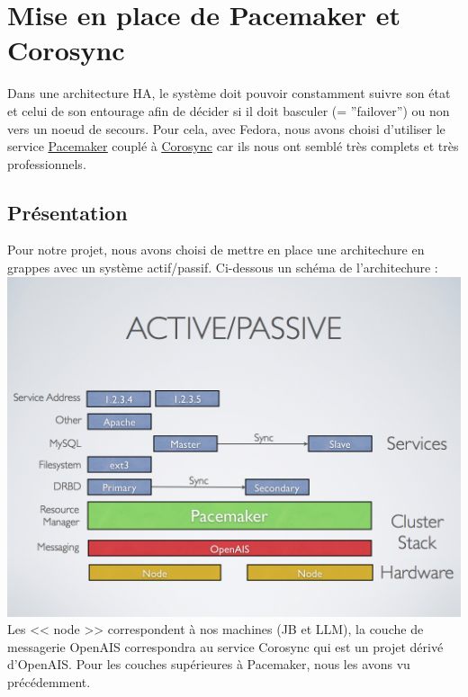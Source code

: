 \documentclass[11pt,a4paper]{report}
\begin{document}
        \section{Mise en place de Pacemaker et Corosync}
            
            Dans une architecture HA, le système doit pouvoir constamment suivre son état et celui de son entourage afin de décider si il doit basculer (= ''failover'') ou non vers un noeud de secours. Pour cela, avec Fedora, nous avons choisi d'utiliser le service \underline{\href{http://clusterlabs.org}{Pacemaker}} couplé à \underline{\href{http://www.corosync.org}{Corosync}} car ils nous ont semblé très complets et très professionnels.
            
            \subsection{Présentation}
                
                Pour notre projet, nous avons choisi de mettre en place une architechure en grappes avec un système actif/passif. Ci-dessous un schéma de l'architechure :\\
                
                \includegraphics[keepaspectratio=true, width=\textwidth]{content/pacemaker-active-passive.png}\\[1cm]
                
                Les << node >> correspondent à nos machines (JB et LLM), la couche de messagerie OpenAIS correspondra au service Corosync qui est un projet dérivé d'OpenAIS. Pour les couches supérieures à Pacemaker, nous les avons vu précédemment.\\
                
\end{document}
